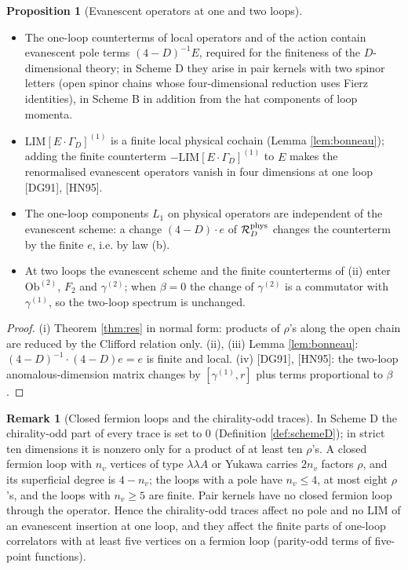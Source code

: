 \documentclass[11pt]{article}
\theoremstyle{definition}
\newtheorem{proposition}[definition]{Proposition}
\newtheorem{remark}[definition]{Remark}
\numberwithin{equation}{section}
\begin{document}
\begin{proposition}[Evanescent operators at one and two loops]
\label{prop:evan}
\mbox{}\begin{itemize}
\item[(i)] The one-loop counterterms of local operators and of the action contain evanescent pole terms $(4-D)^{-1}E$, required for the finiteness of the $D$-dimensional theory; in Scheme D they arise in pair kernels with two spinor letters (open spinor chains whose four-dimensional reduction uses Fierz identities), in Scheme B in addition from the hat components of loop momenta.
\item[(ii)] $\mathrm{LIM}[E\cdot\Gamma_D]^{(1)}$ is a finite local physical cochain (Lemma \ref{lem:bonneau}); adding the finite counterterm $-\mathrm{LIM}[E\cdot\Gamma_D]^{(1)}$ to $E$ makes the renormalised evanescent operators vanish in four dimensions at one loop [DG91], [HN95].
\item[(iii)] The one-loop components $L_1$ on physical operators are independent of the evanescent scheme: a change $(4-D)\cdot e$ of $\mathcal R^{\rm phys}_D$ changes the counterterm by the finite $e$, i.e. by law (b).
\item[(iv)] At two loops the evanescent scheme and the finite counterterms of (ii) enter $\mathrm{Ob}^{(2)}$, $F_2$ and $\gamma^{(2)}$; when $\beta=0$ the change of $\gamma^{(2)}$ is a commutator with $\gamma^{(1)}$, so the two-loop spectrum is unchanged.
\end{itemize}
\end{proposition}

\begin{proof}
(i) Theorem \ref{thm:res} in normal form: products of $\rho$'s along the open chain are reduced by the Clifford relation only. (ii), (iii) Lemma \ref{lem:bonneau}: $(4-D)^{-1}\cdot(4-D)e=e$ is finite and local. (iv) [DG91], [HN95]: the two-loop anomalous-dimension matrix changes by $[\gamma^{(1)},r]$ plus terms proportional to $\beta$.
\end{proof}

\begin{remark}[Closed fermion loops and the chirality-odd traces]
\label{rem:g11}
In Scheme D the chirality-odd part of every trace is set to $0$ (Definition \ref{def:schemeD}); in strict ten dimensions it is nonzero only for a product of at least ten $\rho$'s. A closed fermion loop with $n_v$ vertices of type $\lambda\lambda A$ or Yukawa carries $2n_v$ factors $\rho$, and its superficial degree is $4-n_v$; the loops with a pole have $n_v\le4$, at most eight $\rho$'s, and the loops with $n_v\ge5$ are finite. Pair kernels have no closed fermion loop through the operator. Hence the chirality-odd traces affect no pole and no $\mathrm{LIM}$ of an evanescent insertion at one loop, and they affect the finite parts of one-loop correlators with at least five vertices on a fermion loop (parity-odd terms of five-point functions).
\end{remark}
\end{document}
